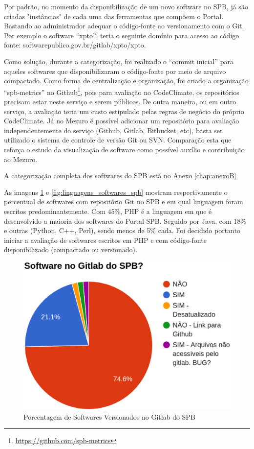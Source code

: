 Por padrão, no momento da disponibilização de um novo software no SPB, já são
criadas "instâncias" de cada uma das ferramentas que compõem o Portal. Bastando
ao administrador adequar o código-fonte ao versionamento com o Git. Por exemplo
o software ``xpto'', teria o seguinte domínio para acesso ao código fonte:
softwarepublico.gov.br/gitlab/xpto/xpto.

Como solução, durante a categorização, foi realizado o ``commit inicial'' para
aqueles softwares que disponibilizaram o código-fonte por meio de arquivo
compactado. Como forma de centralização e organização, foi criado a organização
``spb-metrics'' no Github\footnote{\url{https://github.com/spb-metrics}}, pois
para avaliação no CodeClimate, os repositórios precisam estar neste serviço e
serem públicos. De outra maneira, ou em outro serviço, a avaliação teria um
custo estipulado pelas regras de negócio do próprio CodeClimate. Já no Mezuro é
possível adicionar um repositório para avaliação independentemente do serviço
(Github, Gitlab, Bitbucket, etc), basta ser utilizado o sistema de controle de
versão Git ou SVN. Comparação esta que reforça o estudo da visualização de
software como possível auxílio e contribuição ao Mezuro.

A categorização completa dos softwares do SPB está no Anexo \ref{chap:anexoB}

As imagens \ref{fig:is_software_gitlab_spb} e \ref{fig:linguagens_softwares_spb}
mostram respectivamente o percentual de softwares com repositório Git no SPB e
em qual linguagem foram escritos predominantemente. Com 45\%, PHP é a linguagem
em que é desenvolvido a maioria dos softwares do Portal SPB. Seguido por Java,
com 18\% e outras (Python, C++, Perl), sendo menos de 5\% cada. Foi decidido
portanto iniciar a avaliação de softwares escritos em PHP e com código-fonte
disponibilizado (compactado ou versionado).

\begin{figure}[!htb]
	\centering
    \includegraphics[keepaspectratio=true,scale=0.5]
    {figuras/is_software_gitlab_spb.eps}
  \caption{Porcentagem de Softwares Versionados no Gitlab do SPB}
  \label{fig:is_software_gitlab_spb}
\end{figure}

